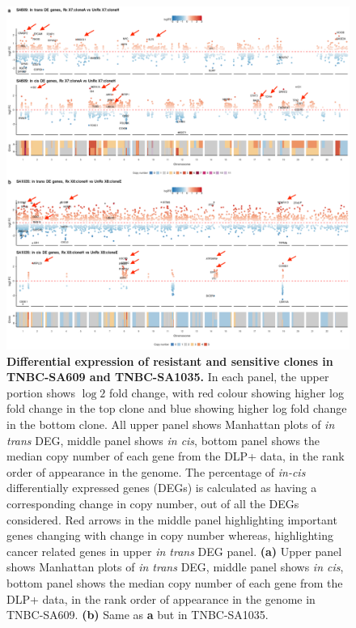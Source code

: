 
\begin{figure}
\centering
  \includegraphics[width=\textwidth]{Figures/chap5/trackplotsSA609SA1035.png}
\caption[DE of resistant and sensitive \texttt{clonealign} defined clones]
	{\small
	\textbf{Differential expression of resistant and sensitive clones in TNBC-SA609 and TNBC-SA1035.}
 In each panel, the upper portion shows $\log 2$ fold change, with red colour showing higher log fold change in the top clone and blue showing higher log fold change in the bottom clone. All upper panel shows Manhattan plots of \textit{in trans} DEG, middle panel shows \textit{in cis}, bottom panel shows the median copy number of each gene from the DLP+ data, in the rank order of appearance in the genome.
 The percentage of \textit{in-cis} differentially expressed genes (DEGs) is calculated as having a corresponding change in copy number, out of all the DEGs considered. Red arrows in the middle panel highlighting important genes changing with change in copy number whereas, highlighting cancer related genes in upper \textit{in trans} DEG panel. 
 \textbf{(a)} Upper panel shows Manhattan plots of \textit{in trans} DEG, middle panel shows \textit{in cis}, bottom panel shows the median copy number of each gene from the DLP+ data, in the rank order of appearance in the genome in TNBC-SA609.
 \textbf{(b)} Same as \textbf{a} but in TNBC-SA1035.
}
	\label{fig:trackplotsSA609SA1035}
 \end{figure}

